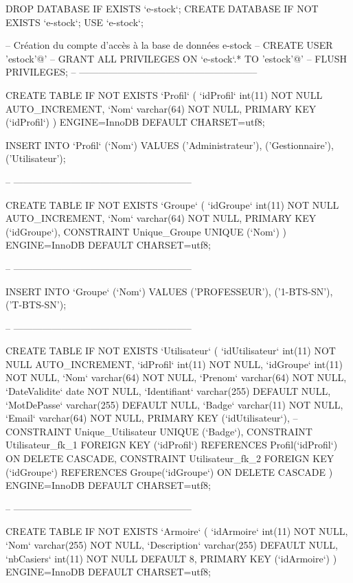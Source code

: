 \begin{DoxyCode}
DROP DATABASE IF EXISTS `e-stock`;
CREATE DATABASE IF NOT EXISTS `e-stock`;
USE `e-stock`;

-- Création du compte d'accès à la base de données e-stock
-- CREATE USER 'estock'@'%
-- GRANT ALL PRIVILEGES ON `e-stock`.* TO 'estock'@'%
-- FLUSH PRIVILEGES;
-- --------------------------------------------------------

CREATE TABLE IF NOT EXISTS `Profil` (
  `idProfil` int(11) NOT NULL AUTO\_INCREMENT,
  `Nom` varchar(64) NOT NULL,
  PRIMARY KEY (`idProfil`)
) ENGINE=InnoDB DEFAULT CHARSET=utf8;

INSERT INTO `Profil` (`Nom`) VALUES
('Administrateur'),
('Gestionnaire'),
('Utilisateur');

-- --------------------------------------------------------

CREATE TABLE IF NOT EXISTS `Groupe` (
  `idGroupe` int(11) NOT NULL AUTO\_INCREMENT,
  `Nom` varchar(64) NOT NULL,
  PRIMARY KEY (`idGroupe`),
  CONSTRAINT Unique\_Groupe UNIQUE (`Nom`)
) ENGINE=InnoDB DEFAULT CHARSET=utf8;

-- --------------------------------------------------------

INSERT INTO `Groupe` (`Nom`) VALUES
('PROFESSEUR'),
('1-BTS-SN'),
('T-BTS-SN');

-- --------------------------------------------------------

CREATE TABLE IF NOT EXISTS `Utilisateur` (
  `idUtilisateur` int(11) NOT NULL AUTO\_INCREMENT,
  `idProfil` int(11) NOT NULL,
  `idGroupe` int(11) NOT NULL,
  `Nom` varchar(64) NOT NULL,
  `Prenom` varchar(64) NOT NULL,
  `DateValidite` date NOT NULL,
  `Identifiant` varchar(255) DEFAULT NULL,
  `MotDePasse` varchar(255) DEFAULT NULL,
  `Badge` varchar(11) NOT NULL,
  `Email` varchar(64) NOT NULL,  
  PRIMARY KEY (`idUtilisateur`),
--  CONSTRAINT Unique\_Utilisateur UNIQUE (`Badge`),
  CONSTRAINT Utilisateur\_fk\_1 FOREIGN KEY (`idProfil`) REFERENCES Profil(`idProfil`) ON DELETE CASCADE,
  CONSTRAINT Utilisateur\_fk\_2 FOREIGN KEY (`idGroupe`) REFERENCES Groupe(`idGroupe`) ON DELETE CASCADE
) ENGINE=InnoDB DEFAULT CHARSET=utf8;

-- --------------------------------------------------------

CREATE TABLE IF NOT EXISTS `Armoire` (
  `idArmoire` int(11) NOT NULL,
  `Nom` varchar(255) NOT NULL,
  `Description` varchar(255) DEFAULT NULL,
  `nbCasiers` int(11) NOT NULL DEFAULT 8,
  PRIMARY KEY (`idArmoire`)
) ENGINE=InnoDB DEFAULT CHARSET=utf8;


\end{DoxyCode}
